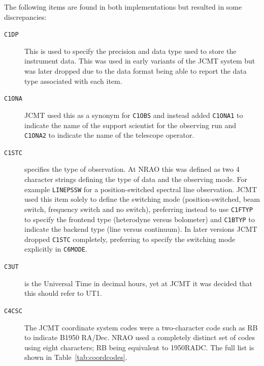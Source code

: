 \documentclass[final,authoryear,5p,times,twocolumn]{elsarticle}
\begin{document}
The following items are found in both implementations but resulted in
some discrepancies:

\begin{description}

\item[\texttt{C1DP}] This is used to specify the precision and data
  type used to store the instrument data. This was used in early
  variants of the JCMT system but was later dropped due to the data
  format being able to report the data type associated with each item.

\item[\texttt{C1ONA}] JCMT used this as a synonym for \texttt{C1OBS}
  and instead added \texttt{C1ONA1} to indicate the name of the
  support scientist for the observing run and \texttt{C1ONA2} to
  indicate the name of the telescope operator.

\item[\texttt{C1STC}] specifies the type of observation. At NRAO this
  was defined as two 4 character strings defining the type of data and
  the observing mode. For example \texttt{LINEPSSW} for a
  position-switched spectral line observation. JCMT used this item
  solely to define the switching mode (position-switched, beam switch,
  frequency switch and no switch), preferring instead to use
  \texttt{C1FTYP} to specify the frontend type (heterodyne versus
  bolometer) and \texttt{C1BTYP} to indicate the backend type (line
  versus continuum). In
  later versions JCMT dropped \texttt{C1STC} completely, preferring to
  specify the switching mode explicitly in \texttt{C6MODE}.

\item[\texttt{C3UT}] is the Universal Time in decimal hours, yet at
  JCMT it was decided that this should refer to UT1.

\item[\texttt{C4CSC}] The JCMT coordinate system codes \citep{mtdn12}
  were a two-character code such as RB to indicate B1950 RA/Dec.
  NRAO used a completely distinct set of codes using eight
  characters; RB being equivalent to 1950RADC. The full list is shown
  in Table~\ref{tab:coordcodes}.


\end{description}
\end{document}
